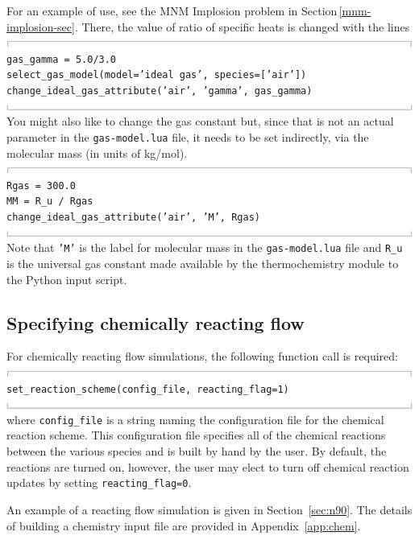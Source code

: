 \documentclass[12pt,a4paper,twoside]{article}
\newcommand{\topbar}{\ensuremath{
    \rule{0.1mm}{2.0mm} \rule[2.0mm]{159.5mm}{0.1mm} \rule{0.1mm}{2.0mm}
}}
\newcommand{\bottombar}{\ensuremath{
    \rule{0.1mm}{2.0mm} \rule{159.5mm}{0.1mm} \rule{0.1mm}{2.0mm}
}}
\begin{document}
\medskip
For an example of use, see the MNM Implosion problem in Section\,\ref{mnm-implosion-sec}.
There, the value of ratio of specific heats is changed with the lines\\
%
\topbar\\
\texttt{gas\_gamma = 5.0/3.0}\\
\texttt{select\_gas\_model(model='ideal gas', species=['air'])}\\
\texttt{change\_ideal\_gas\_attribute('air', 'gamma', gas\_gamma)\\}
\bottombar\\
You might also like to change the gas constant but, since that is not an actual parameter in the 
\texttt{gas-model.lua} file, it needs to be set indirectly, via the molecular mass (in units of kg/mol).\\
\topbar\\
\texttt{Rgas = 300.0}\\
\texttt{MM = R\_u / Rgas}\\
\texttt{change\_ideal\_gas\_attribute('air', 'M', Rgas)\\}
\bottombar\\
Note that \texttt{'M'} is the label for molecular mass in the \texttt{gas-model.lua} file
and \texttt{R\_u} is the universal gas constant made available by the thermochemistry module
to the Python input script.


\subsection{Specifying chemically reacting flow}
For chemically reacting flow simulations, the following function call is
required:\\
%
\topbar\\
\texttt{set\_reaction\_scheme(config\_file, reacting\_flag=1)}\\
\bottombar\\
where \texttt{config\_file} is a string naming the configuration file for the
chemical reaction scheme.  This configuration file specifies all of the chemical
reactions between the various species and is built by hand by the user.
By default, the reactions are turned on, however, the user may elect to turn off
chemical reaction updates by setting \texttt{reacting\_flag=0}.

\medskip
An example of a reacting flow simulation is given in Section~\ref{sec:n90}.
The details of building a chemistry input file are provided in Appendix~\ref{app:chem}.
\end{document}
